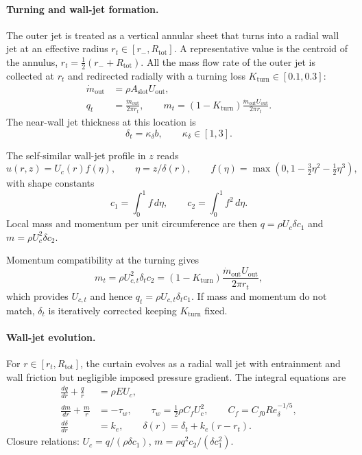 \documentclass[11pt,a4paper]{article}
\begin{document}
\paragraph{Turning and wall-jet formation.}
The outer jet is treated as a vertical annular sheet that turns into a radial wall jet at
an effective radius $r_t \in [r_-, R_{\mathrm{tot}}]$.
A representative value is the centroid of the annulus,
$r_t = \tfrac12 (r_- + R_{\mathrm{tot}})$.
All the mass flow rate of the outer jet is collected at $r_t$
and redirected radially with a turning loss $K_{\mathrm{turn}} \in [0.1,0.3]$:
\begin{align}
\dot m_{\mathrm{out}} &= \rho A_{\mathrm{slot}} U_{\mathrm{out}},\\
q_t &= \frac{\dot m_{\mathrm{out}}}{2\pi r_t}, \qquad
m_t = (1-K_{\mathrm{turn}})\frac{\dot m_{\mathrm{out}} U_{\mathrm{out}}}{2\pi r_t}.
\end{align}
The near-wall jet thickness at this location is
\begin{equation}
\delta_t = \kappa_\delta b, \qquad \kappa_\delta \in [1,3].
\end{equation}

The self-similar wall-jet profile in $z$ reads
\begin{equation}
u(r,z) = U_c(r) f(\eta), \qquad \eta = z/\delta(r), \qquad
f(\eta) = \max(0, 1-\tfrac32 \eta^2 - \tfrac12 \eta^3),
\end{equation}
with shape constants
\begin{equation}
c_1 = \int_0^1 f\,d\eta, \qquad c_2 = \int_0^1 f^2\,d\eta.
\end{equation}
Local mass and momentum per unit circumference are then
$q = \rho U_c \delta c_1$ and $m = \rho U_c^2 \delta c_2$.

Momentum compatibility at the turning gives
\begin{equation}
m_t = \rho U_{c,t}^2 \delta_t c_2 =
(1-K_{\mathrm{turn}})\frac{\dot m_{\mathrm{out}} U_{\mathrm{out}}}{2\pi r_t},
\end{equation}
which provides $U_{c,t}$ and hence $q_t = \rho U_{c,t} \delta_t c_1$.
If mass and momentum do not match, $\delta_t$ is iteratively corrected keeping $K_{\mathrm{turn}}$ fixed.

\paragraph{Wall-jet evolution.}
For $r \in [r_t, R_{\mathrm{tot}}]$, the curtain evolves as a radial wall jet with entrainment
and wall friction but negligible imposed pressure gradient. The integral equations are
\begin{align}
\frac{dq}{dr} + \frac{q}{r} &= \rho E U_c, \label{eq:massbalance}\\
\frac{dm}{dr} + \frac{m}{r} &= -\tau_w, \qquad
\tau_w = \tfrac12 \rho C_f U_c^2, \qquad C_f = C_{f0} Re_\delta^{-1/5}, \label{eq:mombalance}\\
\frac{d\delta}{dr} &= k_e, \qquad \delta(r) = \delta_t + k_e (r - r_t). \label{eq:deltagrowth}
\end{align}
Closure relations: $U_c = q / (\rho \delta c_1)$, $m = \rho q^2 c_2 / (\delta c_1^2)$.
\end{document}
